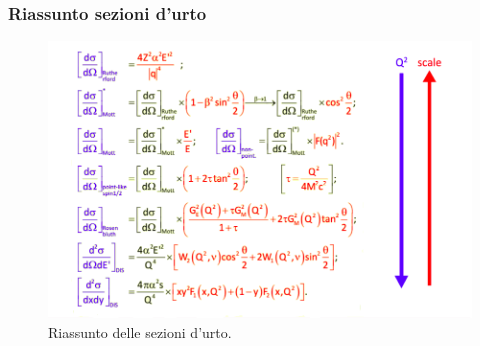 \subsubsection{Riassunto sezioni d'urto}
\begin{figure}[H]
    \centering
    \includegraphics[width=\textwidth]{immagini/fig_summ_cross_sec.png}
    \caption{Riassunto delle sezioni d'urto.}
\end{figure}